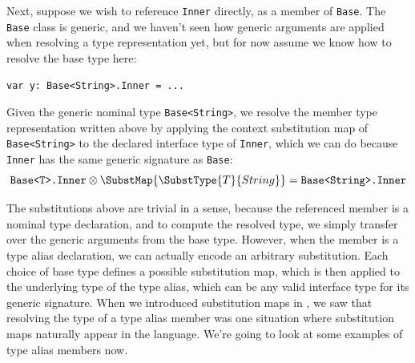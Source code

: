 \documentclass[../generics]{subfiles}
\begin{document}
Next, suppose we wish to reference \texttt{Inner} directly, as a member of \texttt{Base}. The \texttt{Base} class is generic, and we haven't seen how generic arguments are applied when resolving a type representation yet, but for now assume we know how to resolve the base type here:
\begin{Verbatim}
var y: Base<String>.Inner = ...
\end{Verbatim}
Given the generic nominal type \texttt{Base<String>}, we resolve the member type representation written above by applying the context substitution map of \texttt{Base<String>} to the declared interface type of \texttt{Inner}, which we can do because \texttt{Inner} has the same generic signature as \texttt{Base}:
\[\texttt{Base<T>.Inner}\otimes\SubstMap{\SubstType{T}{String}}=\texttt{Base<String>.Inner}\]

The substitutions above are trivial in a sense, because the referenced member is a nominal type declaration, and to compute the resolved type, we simply transfer over the generic arguments from the base type. However, when the member is a type alias declaration, we can actually encode an arbitrary substitution. Each choice of base type defines a possible substitution map, which is then applied to the underlying type of the type alias, which can be any valid interface type for its generic signature. When we introduced substitution maps in , we saw that resolving the type of a type alias member was one situation where substitution maps naturally appear in the language. We're going to look at some examples of type alias members now.

\smallskip
\end{document}
